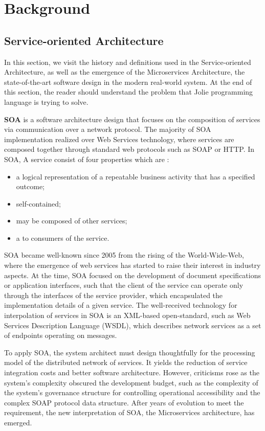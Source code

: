 \chapter{Background}

\section{Service-oriented Architecture}In this section, we visit the history and definitions used in the Service-oriented Architecture, as well as the emergence of the Microservices Architecture, the state-of-the-art software design in the modern real-world system. At the end of this section, the reader should understand the problem that Jolie programming language is trying to solve.

\textbf{SOA} is a software architecture design that focuses on the composition of services via communication over a network protocol. The majority of SOA implementation realized over Web Services technology, where services are composed together through standard web protocols such as SOAP\cite{Mendelsohn:07:SVP} or HTTP\cite{http-rfc}. In SOA, A service consist of four properties which are \cite{SOAopengroup} :

\begin{itemize}
    \item a logical representation of a repeatable business activity that has a specified outcome;
    \item self-contained;
    \item may be composed of other services;
    \item a  to consumers of the service.
\end{itemize}

SOA became well-known since 2005 from the rising of the World-Wide-Web, where the emergence of web services has started to raise their interest in industry aspects. At the time, SOA focused on the development of document specifications or application interfaces, such that the client of the service can operate only through the interfaces of the service provider, which encapsulated the implementation details of a given service. The well-received technology for interpolation of services in SOA is an XML-based open-standard\cite{mahmoud-2005}, such as Web Services Description Language (WSDL)\cite{Moreau:07:WSD}, which describes network services as a set of endpoints operating on messages.

To apply SOA, the system architect must design thoughtfully for the processing model of the distributed network of services\cite{SOAopengroup-digitalage}. It yields the reduction of service integration costs and better software architecture. However, criticisms rose as the system's complexity obscured the development budget, such as the complexity of the system's governance structure for controlling operational accessibility and the complex SOAP protocol data structure\cite{SOAopengroup-digitalage}. After years of evolution to meet the requirement,
the new interpretation of SOA, the Microservices architecture, has emerged.

